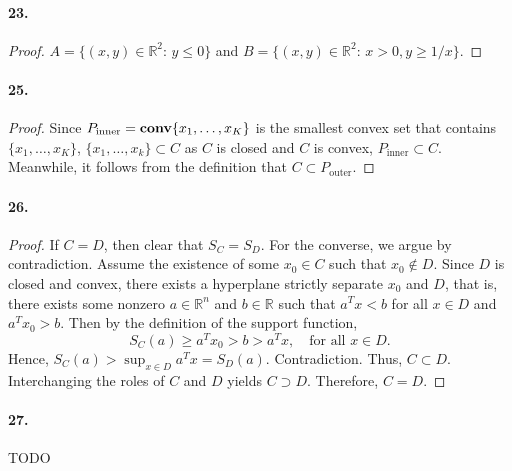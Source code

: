   \paragraph{23.}
  \begin{proof}
    $A=\{(x,y)\in\mathbb{R}^2:\,y\le 0\}$ and $B=\{(x,y)\in\mathbb{R}^2:\,x>0,
    y\ge 1/x\}$.
  \end{proof}
  
  \paragraph{25.}
  \begin{proof}
    Since $P_{\text{inner}}=\operatorname{\mathbf{conv}}\{x_1,\dots,x_K\}$ is the smallest convex set
    that contains $\{x_1,\dots,x_K\}$, $\{x_1,\dots,x_k\}\subset C$ as $C$ is
    closed and $C$ is convex, $P_{\text{inner}}\subset C$. Meanwhile, it follows
    from the definition that $C\subset P_{\text{outer}}$.
  \end{proof}
  
  \paragraph{26.}
  \begin{proof}
    If $C=D$, then clear that $S_C=S_D$. For the converse, we argue by 
    contradiction. Assume the existence of some $x_0\in C$ such that $x_0\notin 
    D$. Since $D$ is closed and convex, there exists a hyperplane strictly 
    separate $x_0$ and $D$, that is, there exists some nonzero $a\in\mathbb{R}
    ^n$ and $b\in\mathbb{R}$ such that $a^Tx<b$ for all $x\in D$ and $a^Tx_0>b$.
    Then by the definition of the support function, 
    \[
      S_C(a)\ge a^Tx_0 > b > a^Tx,\quad\text{for all $x\in D.$}
    \]
    Hence, $S_C(a)>\sup_{x\in D}a^Tx=S_D(a)$. Contradiction. Thus, $C\subset D$.
    Interchanging the roles of $C$ and $D$ yields $C\supset D$. Therefore, 
    $C=D$.
  \end{proof}
  
  \paragraph{27.} TODO



























